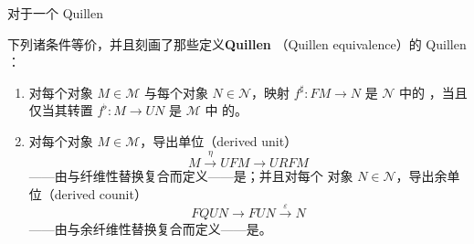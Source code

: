 \begin{lemma}\label{lem:quillen-equivalence}
对于一个 Quillen \trAdjunction
\begin{center}
\end{center}
下列诸条件等价，并且刻画了那些定义\textbf{Quillen \trEquivalence}（Quillen
equivalence）的 Quillen \trAdjunction：
\begin{enumerate}[label=(\roman*)]
\item 对每个\trCofibrant{}对象 $M\in\mathcal{M}$ 与每个\trFibrant{}对象
  $N\in\mathcal{N}$，映射 $f^{\sharp}\colon FM\to N$ 是 $\mathcal{N}$ 中的%
\trWeakEquivalence，当且仅当其转置 $f^{\flat}\colon M\to UN$ 是 $\mathcal{M}$ 中
的\trWeakEquivalence。
\item 对每个\trCofibrant{}对象 $M\in\mathcal{M}$，导出单位（derived unit）
  \[ M\xrightarrow{\ \eta\ }UFM\longrightarrow URFM \]
  ——由\trUnit{}与纤维性替换复合而定义——是\trWeakEquivalence；并且对每个%
\trFibrant{}对象 $N\in\mathcal{N}$，导出余单位（derived counit）
  \[ FQUN\longrightarrow FUN\xrightarrow{\ \varepsilon\ }N \]
  ——由\trCounit{}与余纤维性替换复合而定义——是\trWeakEquivalence。
\end{enumerate}
\end{lemma}


